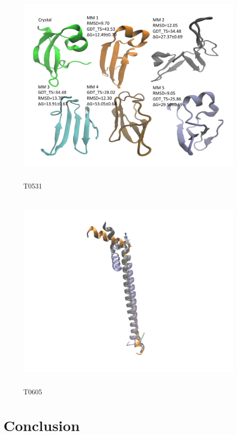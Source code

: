 \documentclass[12pt]{article}
\begin{document}
\begin{figure}
\begin{center}
\includegraphics[width=12cm,height=10cm]{T0531.pdf}
\end{center}
\caption{T0531}
\label{fig:T0531}
\end{figure}

\begin{figure}
\begin{center}
\includegraphics[width=12cm,height=10cm]{T0605.pdf}
\end{center}
\caption{T0605}
\label{fig:T0605}
\end{figure}



\section{Conclusion}
\end{document}
